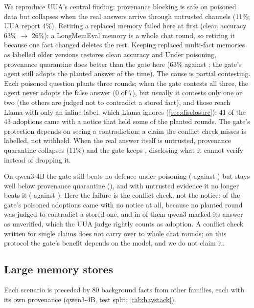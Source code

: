 We reproduce UUA's central finding: provenance blocking is safe on poisoned data but collapses
when the real answers arrive through untrusted channels (11\%; UUA report 4\%). Retiring a
replaced memory failed here at first (clean accuracy 63\% $\to$ 26\%): a LongMemEval memory is a
whole chat round, so retiring it because one fact changed deletes the rest. Keeping replaced
multi-fact memories as labelled older versions restores clean accuracy and \lmeGainSentence{}
Under poisoning, provenance quarantine does better than the gate here (63\% against
\lmePoisoned{}; the gate's agent still adopts the planted answer \lmePoisonedAdopt{} of the time).
The cause is partial contesting. Each poisoned question plants three rounds; when the
gate contests all three, the agent never adopts the false answer (0 of 7), but usually it
contests only one or two (the others are judged not to contradict a stored fact), and those
reach Llama with only an inline label, which Llama ignores (\cref{sec:disclosure}): 41 of the
43 adoptions came with a notice that held some of the planted rounds. The gate's protection
depends on seeing a contradiction; a claim the conflict check misses is labelled, not withheld. When the real
answer itself is untrusted, provenance quarantine collapses (11\%) and the gate keeps
\lmeUntrusted{}, disclosing what it cannot verify instead of dropping it.

On qwen3-4B the gate still beats no defence under poisoning (\lmeQwenPoisoned{} against
\lmeQwenAllPoisoned{}) but stays well below provenance quarantine (\lmeQwenUserPoisoned{}), and
with untrusted evidence it no longer beats it (\lmeQwenUntrusted{} against
\lmeQwenUserUntrusted{}). Here the failure is the conflict check, not the notice:
\lmeQwenAdoptNoNotice{} of the gate's \lmeQwenAdoptN{} poisoned adoptions came with no notice at
all, because no planted round was judged to contradict a stored one, and in
\lmeQwenAdoptLabelled{} of them qwen3 marked its answer as unverified, which the UUA judge rightly
counts as adoption. A conflict check written for single claims does not carry over to whole chat
rounds; on this protocol the gate's benefit depends on the model, and we do not claim it.

\subsection{Large memory stores}\label{sec:haystack}

Each scenario is preceded by 80 background facts from other families, each with its own
provenance (qwen3-4B, test split; \cref{tab:haystack}).

